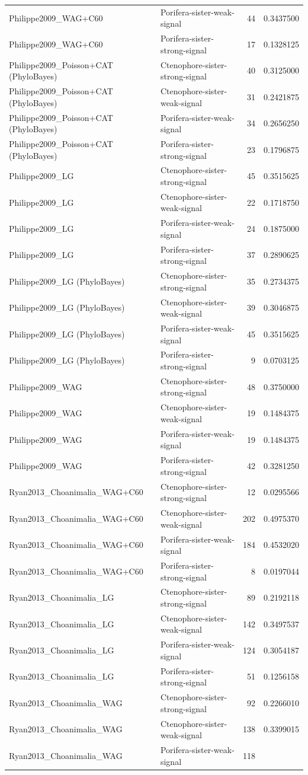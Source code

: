 \documentclass[]{article}
\begin{document}
\begin{longtable}[]{@{}llrr@{}}
Philippe2009\_WAG+C60 & Porifera-sister-weak-signal & 44 &
0.3437500\tabularnewline
Philippe2009\_WAG+C60 & Porifera-sister-strong-signal & 17 &
0.1328125\tabularnewline
Philippe2009\_Poisson+CAT (PhyloBayes) & Ctenophore-sister-strong-signal
& 40 & 0.3125000\tabularnewline
Philippe2009\_Poisson+CAT (PhyloBayes) & Ctenophore-sister-weak-signal &
31 & 0.2421875\tabularnewline
Philippe2009\_Poisson+CAT (PhyloBayes) & Porifera-sister-weak-signal &
34 & 0.2656250\tabularnewline
Philippe2009\_Poisson+CAT (PhyloBayes) & Porifera-sister-strong-signal &
23 & 0.1796875\tabularnewline
Philippe2009\_LG & Ctenophore-sister-strong-signal & 45 &
0.3515625\tabularnewline
Philippe2009\_LG & Ctenophore-sister-weak-signal & 22 &
0.1718750\tabularnewline
Philippe2009\_LG & Porifera-sister-weak-signal & 24 &
0.1875000\tabularnewline
Philippe2009\_LG & Porifera-sister-strong-signal & 37 &
0.2890625\tabularnewline
Philippe2009\_LG (PhyloBayes) & Ctenophore-sister-strong-signal & 35 &
0.2734375\tabularnewline
Philippe2009\_LG (PhyloBayes) & Ctenophore-sister-weak-signal & 39 &
0.3046875\tabularnewline
Philippe2009\_LG (PhyloBayes) & Porifera-sister-weak-signal & 45 &
0.3515625\tabularnewline
Philippe2009\_LG (PhyloBayes) & Porifera-sister-strong-signal & 9 &
0.0703125\tabularnewline
Philippe2009\_WAG & Ctenophore-sister-strong-signal & 48 &
0.3750000\tabularnewline
Philippe2009\_WAG & Ctenophore-sister-weak-signal & 19 &
0.1484375\tabularnewline
Philippe2009\_WAG & Porifera-sister-weak-signal & 19 &
0.1484375\tabularnewline
Philippe2009\_WAG & Porifera-sister-strong-signal & 42 &
0.3281250\tabularnewline
Ryan2013\_Choanimalia\_WAG+C60 & Ctenophore-sister-strong-signal & 12 &
0.0295566\tabularnewline
Ryan2013\_Choanimalia\_WAG+C60 & Ctenophore-sister-weak-signal & 202 &
0.4975370\tabularnewline
Ryan2013\_Choanimalia\_WAG+C60 & Porifera-sister-weak-signal & 184 &
0.4532020\tabularnewline
Ryan2013\_Choanimalia\_WAG+C60 & Porifera-sister-strong-signal & 8 &
0.0197044\tabularnewline
Ryan2013\_Choanimalia\_LG & Ctenophore-sister-strong-signal & 89 &
0.2192118\tabularnewline
Ryan2013\_Choanimalia\_LG & Ctenophore-sister-weak-signal & 142 &
0.3497537\tabularnewline
Ryan2013\_Choanimalia\_LG & Porifera-sister-weak-signal & 124 &
0.3054187\tabularnewline
Ryan2013\_Choanimalia\_LG & Porifera-sister-strong-signal & 51 &
0.1256158\tabularnewline
Ryan2013\_Choanimalia\_WAG & Ctenophore-sister-strong-signal & 92 &
0.2266010\tabularnewline
Ryan2013\_Choanimalia\_WAG & Ctenophore-sister-weak-signal & 138 &
0.3399015\tabularnewline
Ryan2013\_Choanimalia\_WAG & Porifera-sister-weak-signal & 118 &

\end{longtable}
\end{document}
